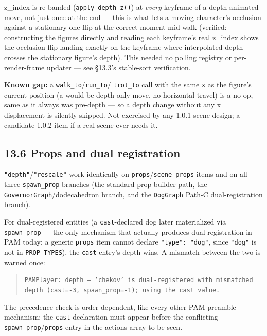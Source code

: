 \documentclass[
  11pt,
]{book}
\begin{document}
z\_index is re-banded (\texttt{apply\_depth\_z()}) at \emph{every}
keyframe of a depth-animated move, not just once at the end --- this
is what lets a moving character's occlusion against a stationary one
flip at the correct moment mid-walk (verified: constructing the
figures directly and reading each keyframe's real z\_index shows the
occlusion flip landing exactly on the keyframe where interpolated
depth crosses the stationary figure's depth). This needed no polling
registry or per-render-frame updater --- see \S13.3's stable-sort
verification.

\textbf{Known gap:} a \texttt{walk\_to}/\texttt{run\_to}/
\texttt{trot\_to} call with the same \texttt{x} as the figure's
current position (a would-be depth-only move, no horizontal travel) is
a no-op, same as it always was pre-depth --- so a depth change without
any x displacement is silently skipped. Not exercised by any 1.0.1
scene design; a candidate 1.0.2 item if a real scene ever needs it.

\subsection{\texorpdfstring{13.6 Props and dual registration}{13.6 Props and dual registration}}\label{props-and-dual-registration}

\texttt{"depth"}/\texttt{"rescale"} work identically on
\texttt{props}/\texttt{scene\_props} items and on all three
\texttt{spawn\_prop} branches (the standard prop-builder path, the
\texttt{GovernorGraph}/dodecahedron branch, and the \texttt{DogGraph}
Path-C dual-registration branch).

For dual-registered entities (a \texttt{cast}-declared dog later
materialized via \texttt{spawn\_prop} --- the only mechanism that
actually produces dual registration in PAM today; a generic
\texttt{props} item cannot declare \texttt{"type": "dog"}, since
\texttt{"dog"} is not in \texttt{PROP\_TYPES}), the \texttt{cast}
entry's depth wins. A mismatch between the two is warned once:

\begin{quote}
\texttt{PAMPlayer: depth --- 'chekov' is dual-registered with
mismatched depth (cast=-3, spawn\_prop=-1); using the cast value.}
\end{quote}

The precedence check is order-dependent, like every other PAM preamble
mechanism: the \texttt{cast} declaration must appear before the
conflicting \texttt{spawn\_prop}/\texttt{props} entry in the actions
array to be seen.
\end{document}
